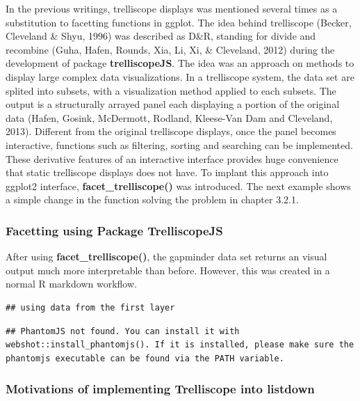 \documentclass[
]{article}
\begin{document}
In the previous writings, trelliscope displays was mentioned several
times as a substitution to facetting functions in ggplot. The idea
behind trelliscope (Becker, Cleveland \& Shyu, 1996) was described as
D\&R, standing for divide and recombine (Guha, Hafen, Rounds, Xia, Li,
Xi, \& Cleveland, 2012) during the development of package
\textbf{trelliscopeJS}. The idea was an approach on methods to display
large complex data visualizations. In a trelliscope system, the data set
are splited into subsets, with a visualization method applied to each
subsets. The output is a structurally arrayed panel each displaying a
portion of the original data (Hafen, Gosink, McDermott, Rodland,
Kleese-Van Dam and Cleveland, 2013). Different from the original
trelliscope displays, once the panel becomes interactive, functions such
as filtering, sorting and searching can be implemented. These derivative
features of an interactive interface provides huge convenience that
static trelliscope displays does not have. To implant this approach into
ggplot2 interface, \textbf{facet\_trelliscope()} was introduced. The
next example shows a simple change in the function solving the problem
in chapter 3.2.1.

\hypertarget{facetting-using-package-trelliscopejs}{%
\subsubsection{Facetting using Package
TrelliscopeJS}\label{facetting-using-package-trelliscopejs}}

After using \textbf{facet\_trelliscope()}, the gapminder data set
returns an visual output much more interpretable than before. However,
this was created in a normal R markdown workflow.

\begin{verbatim}
## using data from the first layer
\end{verbatim}

\begin{verbatim}
## PhantomJS not found. You can install it with webshot::install_phantomjs(). If it is installed, please make sure the phantomjs executable can be found via the PATH variable.
\end{verbatim}

\hypertarget{motivations-of-implementing-trelliscope-into-listdown}{%
\subsubsection{Motivations of implementing Trelliscope into
listdown}\label{motivations-of-implementing-trelliscope-into-listdown}}
\end{document}
